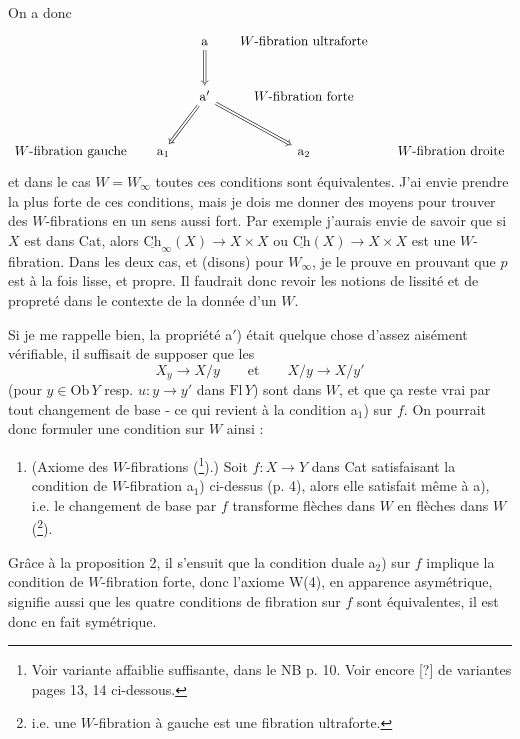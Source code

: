 \documentclass[11pt]{article}
\newcommand{\printedpage}[1]{\marginpar{\footnotesize p.~#1}}
\newcommand{\msp}[1]{\marginpar{\footnotesize [#1]}}
\newcommand{\Ch}{\underline{\mathrm{Ch}}}
\begin{document}
On a donc
\[
\begin{tikzcd}[row sep=large, column sep=1.4em]
 & & \mathrm{a} \arrow[d, Rightarrow] & \text{$W$-fibration ultraforte} & \\
 & & \mathrm{a}' \arrow[dl, Rightarrow] \arrow[dr, Rightarrow] & \text{$W$-fibration forte} & \\
\text{$W$-fibration gauche} & \mathrm{a}_1 & & \mathrm{a}_2 & \text{$W$-fibration droite}
\end{tikzcd}
\]
\printedpage{5}
et dans le cas $W = W_\infty$ toutes ces conditions sont équivalentes. J'ai envie prendre la plus forte de ces conditions, mais je dois me donner des moyens pour trouver des $W$-fibrations en un sens aussi fort. Par exemple j'aurais envie de savoir que si $X$
\msp{page 5}
est dans Cat, alors $\Ch_\infty(X) \longrightarrow X \times X$ ou $\Ch(X) \longrightarrow X \times X$ est une $W$-fibration. Dans les deux cas, et (disons) pour $W_\infty$, je le prouve en prouvant que $p$ est à la fois lisse, et propre. Il faudrait donc revoir les notions de lissité et de propreté dans le contexte de la donnée d'un $W$.

Si je me rappelle bien, la propriété a$'$) était quelque chose d'assez aisément vérifiable, il suffisait de supposer que les
\[ X_y \longrightarrow X/y \qquad \text{et} \qquad X/y \longrightarrow X/y' \]
(pour $y \in \mathrm{Ob}\,Y$ resp. $u : y \longrightarrow y'$ dans $\mathrm{Fl}\,Y$) sont dans $W$, et que ça reste vrai par tout changement de base - ce qui revient à la condition a$_1$) sur $f$. On pourrait donc formuler une condition sur $W$ ainsi :

\begin{enumerate}[leftmargin=*]
\item[\textbf{W(4)}] (Axiome des $W$-fibrations (\footnote[6]{Voir variante affaiblie suffisante, dans le NB p. 10. Voir encore [?] de variantes pages 13, 14 ci-dessous.}).) Soit $f : X \longrightarrow Y$ dans Cat satisfaisant la condition de $W$-fibration a$_1$) ci-dessus (p. 4), alors elle satisfait même à a), i.e. le changement de base par $f$ transforme flèches dans $W$ en flèches dans $W$ (\footnote[7]{i.e. une $W$-fibration à gauche est une fibration ultraforte.}).
\end{enumerate}

Grâce à la proposition 2, il s'ensuit que la condition duale a$_2$) sur $f$ implique la condition de $W$-fibration forte, donc l'axiome W(4), en apparence asymétrique, signifie aussi que les quatre conditions de fibration sur $f$ sont équivalentes, il est donc en fait symétrique.
\end{document}
